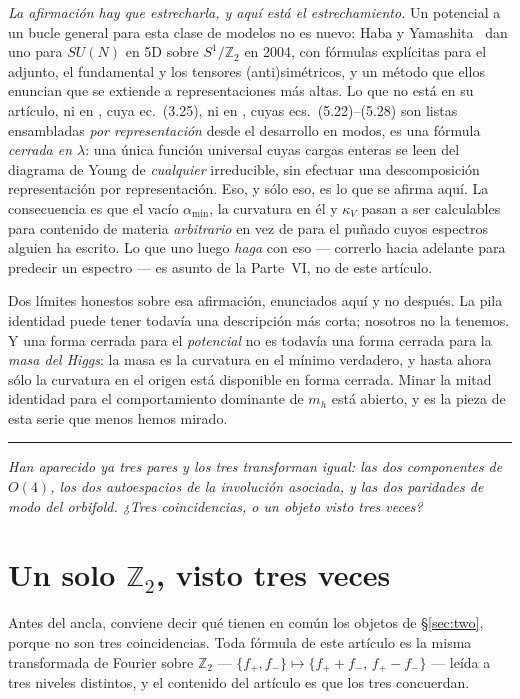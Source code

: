 \documentclass[11pt,a4paper]{article}
\newcommand{\ZZ}{\mathbb{Z}}
\newcommand{\su}[1]{SU(#1)}
\newcommand{\bridge}[1]{\par\medskip\noindent
  \textcolor{hdrblue!45}{\rule{2.2cm}{0.6pt}}\;\;\parbox[t]{0.84\textwidth}{\small\itshape
  \textcolor{hdrblue!85}{#1}}\par\medskip}
\begin{document}
\noindent \emph{La afirmación hay que estrecharla, y aquí está el estrechamiento.} Un potencial a un
bucle general para esta clase de modelos no es nuevo: Haba y Yamashita~\cite{HY} dan uno para $\su N$
en 5D sobre $S^1/\ZZ_2$ en 2004, con fórmulas explícitas para el adjunto, el fundamental y los
tensores (anti)simétricos, y un método que ellos enuncian que se extiende a representaciones más
altas. Lo que no está en su artículo, ni en \cite{AHMN}, cuya ec.~(3.25), ni en \cite{KKKY}, cuyas
ecs.~(5.22)--(5.28) son listas ensambladas \emph{por representación} desde el desarrollo en modos, es
una fórmula \emph{cerrada en $\lambda$}: una única función universal cuyas cargas enteras se leen del
diagrama de Young de \emph{cualquier} irreducible, sin efectuar una descomposición representación por
representación. Eso, y sólo eso, es lo que se afirma aquí. La consecuencia es que el vacío
$\alpha_{\min}$, la curvatura en él y $\kappa_V$ pasan a ser calculables para contenido de materia
\emph{arbitrario} en vez de para el puñado cuyos espectros alguien ha escrito. Lo que uno luego
\emph{haga} con eso --- correrlo hacia adelante para predecir un espectro --- es asunto de la
Parte~VI, no de este artículo.

Dos límites honestos sobre esa afirmación, enunciados aquí y no después. La pila identidad puede
tener todavía una descripción más corta; nosotros no la tenemos. Y una forma cerrada para el
\emph{potencial} no es todavía una forma cerrada para la \emph{masa del Higgs}: la masa es la
curvatura en el mínimo verdadero, y hasta ahora sólo la curvatura en el origen está disponible en
forma cerrada. Minar la mitad identidad para el comportamiento dominante de $m_h$ está abierto, y es
la pieza de esta serie que menos hemos mirado.

\bridge{Han aparecido ya tres pares y los tres transforman igual: las dos componentes de $O(4)$, los
dos autoespacios de la involución asociada, y las dos paridades de modo del orbifold. ¿Tres
coincidencias, o un objeto visto tres veces?}

\section{Un solo $\ZZ_2$, visto tres veces}\label{sec:onez2}

Antes del ancla, conviene decir qué tienen en común los objetos de \S\ref{sec:two}, porque no son
tres coincidencias. Toda fórmula de este artículo es la misma transformada de Fourier sobre $\ZZ_2$
--- $\{f_+,f_-\}\mapsto\{f_++f_-,\,f_+-f_-\}$ --- leída a tres niveles distintos, y el contenido del
artículo es que los tres concuerdan.
\end{document}
